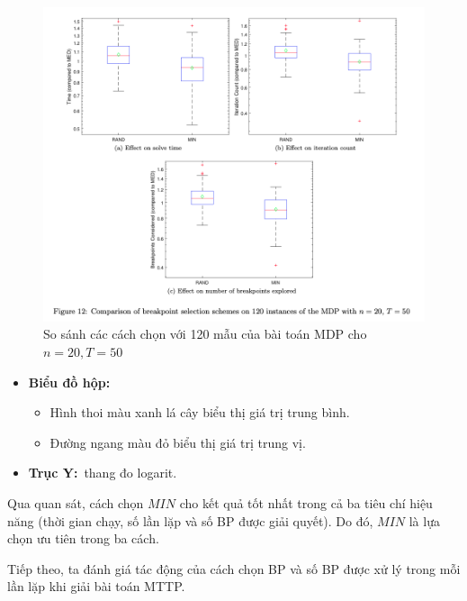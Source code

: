 \documentclass[../main.tex]{subfiles}
\begin{document}
\begin{figure}
\centering
\includegraphics{images/Figure12.png}
\caption{So sánh các cách chọn với 120 mẫu của bài toán MDP cho \(n=20, T=50\)}
\label{fig:12}

\end{figure}

\begin{itemize}
\tightlist
\item
  \textbf{Biểu đồ hộp:}

  \begin{itemize}
  \tightlist
  \item
    Hình thoi màu xanh lá cây biểu thị giá trị trung bình.
  \item
    Đường ngang màu đỏ biểu thị giá trị trung vị.
  \end{itemize}
\item
  \textbf{Trục Y:}~thang đo logarit.
\end{itemize}

Qua quan sát, cách chọn \(MIN\) cho kết quả tốt nhất trong cả ba tiêu
chí hiệu năng (thời gian chạy, số lần lặp và số BP được giải quyết). Do
đó, \(MIN\) là lựa chọn ưu tiên trong ba cách.

Tiếp theo, ta đánh giá tác động của cách chọn BP và số BP được xử lý
trong mỗi lần lặp khi giải bài toán MTTP.
\end{document}
